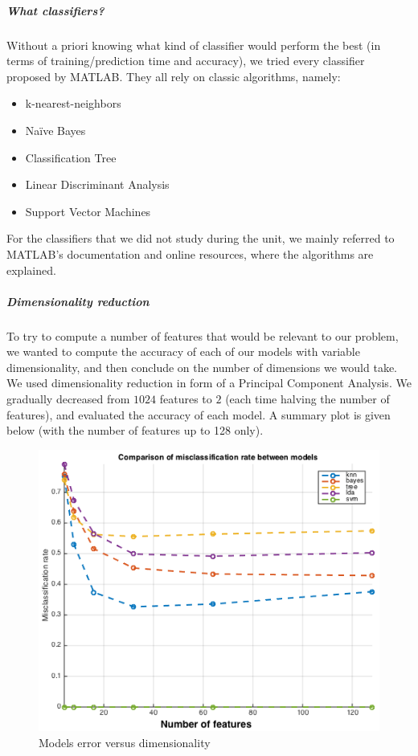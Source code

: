 \documentclass[twocolumn]{article}%
\begin{document}
	\subparagraph{What classifiers?}
	Without a priori knowing what kind of classifier would perform the best (in terms of training/prediction time and accuracy), we tried every classifier proposed by MATLAB. They all rely on classic algorithms, namely:
	\begin{itemize}
	\item k-nearest-neighbors
	\item Naïve Bayes
	\item Classification Tree
	\item Linear Discriminant Analysis
	\item Support Vector Machines
	\end{itemize}
	
	For the classifiers that we did not study during the unit, we mainly referred to MATLAB's documentation and online resources, where the algorithms are explained.
	
	\subparagraph{Dimensionality reduction}
	To try to compute a number of features that would be relevant to our problem, we wanted to compute the accuracy of each of our models with variable dimensionality, and then conclude on the number of dimensions we would take.
	We used dimensionality reduction in form of a Principal Component Analysis. We gradually decreased from $1024$ features to $2$ (each time halving the number of features), and evaluated the accuracy of each model. A summary plot is given below (with the number of features up to 128 only).
	
	\begin{figure}[htp]
	\centering
	\includegraphics[scale=0.45]{images/error_vs_dimension.png}
	\caption{Models error versus dimensionality}
	\end{figure}
	
\end{document}
